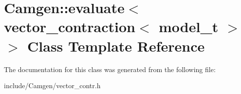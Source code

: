 \hypertarget{a00200}{\section{Camgen\-:\-:evaluate$<$ vector\-\_\-contraction$<$ model\-\_\-t $>$ $>$ Class Template Reference}
\label{a00200}
}


The documentation for this class was generated from the following file\-:\begin{DoxyCompactItemize}
\item 
include/\-Camgen/vector\-\_\-contr.\-h\end{DoxyCompactItemize}
